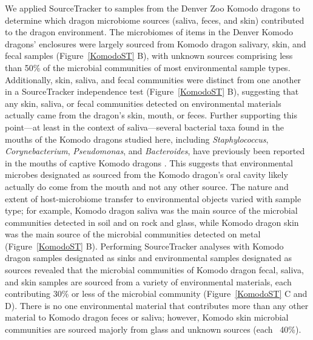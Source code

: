 We applied SourceTracker \cite{Knights2011} to samples from the Denver Zoo Komodo
dragons to determine which dragon microbiome sources (saliva, feces, and skin)
contributed to the dragon environment. The microbiomes of items in the Denver
Komodo dragons’ enclosures were largely sourced from Komodo dragon salivary, skin,
and fecal samples (Figure~\ref{KomodoST} B), with unknown sources comprising less
than 50\% of the microbial communities of most environmental sample types.
Additionally, skin, saliva, and fecal communities were distinct from one another
in a SourceTracker independence test (Figure~\ref{KomodoST} B), suggesting that
any skin, saliva, or fecal communities detected on environmental materials actually
came from the dragon’s skin, mouth, or feces. Further supporting this point—at
least in the context of saliva—several bacterial taxa found in the mouths of the
Komodo dragons studied here, including \emph{Staphylococcus}, \emph{Corynebacterium},
\emph{Pseudomonas}, and \emph{Bacteroides}, have previously been reported in the
mouths of captive Komodo dragons \cite{Montgomery2002, Goldstein2013}. This
suggests that environmental microbes designated as sourced from the Komodo dragon’s
oral cavity likely actually do come from the mouth and not any other source. The
nature and extent of host-microbiome transfer to environmental objects varied with
sample type; for example, Komodo dragon saliva was the main source of the microbial
communities detected in soil and on rock and glass, while Komodo dragon skin was
the main source of the microbial communities detected on metal (Figure~\ref{KomodoST} B).
Performing SourceTracker analyses with Komodo dragon samples designated as sinks
and environmental samples designated as sources revealed that the microbial
communities of Komodo dragon fecal, saliva, and skin samples are sourced from a
variety of environmental materials, each contributing 30\% or less of the microbial community
(Figure~\ref{KomodoST} C and D). There is no one environmental material that contributes
more than any other material to Komodo dragon feces or saliva; however, Komodo skin microbial
communities are sourced majorly from glass and unknown sources (each ~40\%).

